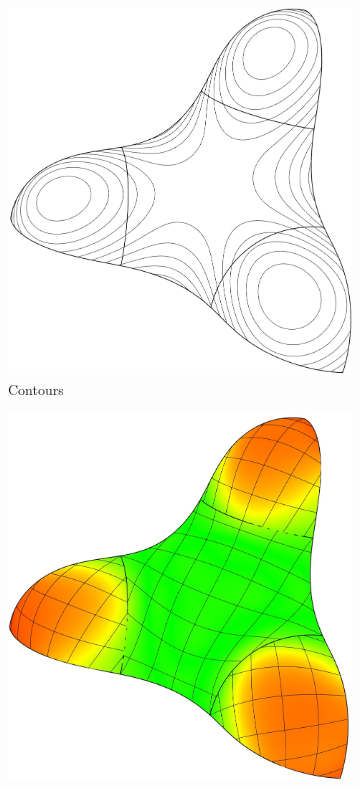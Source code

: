 \documentclass[9pt,academicons]{article}
\begin{document}
\begin{figure}[h!]
\begin{subfigure}{.24\textwidth}
    \includegraphics[height=.207\textheight]{images/trebol3-contour.jpg}
    \caption{Contours}
    \label{fig:trebol-contours}
  \end{subfigure}
  \hfill
  \begin{subfigure}{.24\textwidth}
    \centering
    \includegraphics[height=.207\textheight]{images/trebol3-mean-iso.jpg}

\end{subfigure}
\end{figure}
\end{document}

